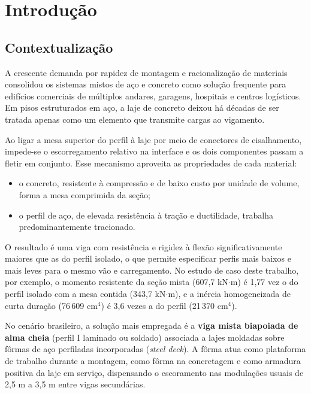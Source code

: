 \chapter{Introdução}\label{cap:1}

\section{Contextualização}\label{sec:1.1}
A crescente demanda por rapidez de montagem e racionalização de materiais consolidou os sistemas mistos de aço e concreto como solução frequente para edifícios comerciais de múltiplos andares, garagens, hospitais e centros logísticos. Em pisos estruturados em aço, a laje de concreto deixou há décadas de ser tratada apenas como um elemento que transmite cargas ao vigamento.

Ao ligar a mesa superior do perfil à laje por meio de conectores de cisalhamento, impede-se o escorregamento relativo na interface e os dois componentes passam a fletir em conjunto. Esse mecanismo aproveita as propriedades de cada material:
\begin{itemize}
\item o concreto, resistente à compressão e de baixo custo por unidade de volume, forma a mesa comprimida da seção;
\item o perfil de aço, de elevada resistência à tração e ductilidade, trabalha predominantemente tracionado.
\end{itemize}

O resultado é uma viga com resistência e rigidez à flexão significativamente maiores que as do perfil isolado, o que permite especificar perfis mais baixos e mais leves para o mesmo vão e carregamento. No estudo de caso deste trabalho, por exemplo, o momento resistente da seção mista (607,7 kN\ensuremath{\cdot}m) é 1,77 vez o do perfil isolado com a mesa contida (343,7 kN\ensuremath{\cdot}m), e a inércia homogeneizada de curta duração (76\,609 cm\ensuremath{^4}) é 3,6 vezes a do perfil (21\,370 cm\ensuremath{^4}).

No cenário brasileiro, a solução mais empregada é a \textbf{viga mista biapoiada de alma cheia} (perfil I laminado ou soldado) associada a lajes moldadas sobre fôrmas de aço perfiladas incorporadas (\emph{steel deck}). A fôrma atua como plataforma de trabalho durante a montagem, como fôrma na concretagem e como armadura positiva da laje em serviço, dispensando o escoramento nas modulações usuais de 2,5 m a 3,5 m entre vigas secundárias.

